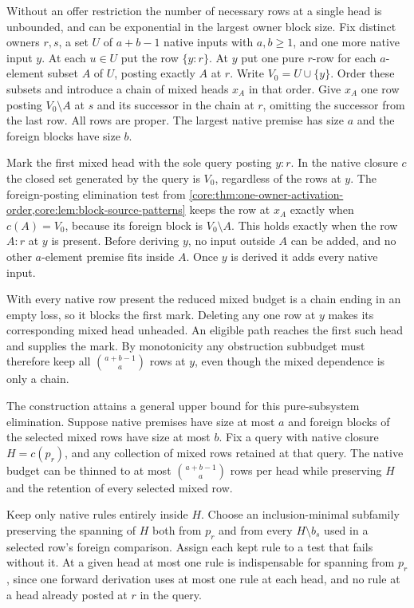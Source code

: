 Without an offer restriction the number of necessary
rows at a single head is unbounded, and can be
exponential in the largest owner block size. Fix
distinct owners $r,s$, a set $U$ of $a+b-1$ native
inputs with $a,b\ge1$, and one more native input $y$.
At each
$u\in U$ put the row $\{y:r\}$. At $y$ put one
pure $r$-row for each $a$-element subset $A$ of $U$,
posting exactly $A$ at $r$. Write $V_0=U\cup\{y\}$.
Order these subsets and introduce a chain of mixed
heads $x_A$ in that order. Give $x_A$ one row
posting $V_0\setminus A$ at $s$ and its successor
in the chain at $r$, omitting the successor from
the last row. All rows are proper. The largest
native premise has size $a$ and the foreign blocks
have size $b$.

Mark the first mixed head with the sole query
posting $y:r$. In the native closure $c$ the
closed set generated by the query is $V_0$,
regardless of the rows at $y$. The foreign-posting
elimination test from
\cref{core:thm:one-owner-activation-order,core:lem:block-source-patterns}
keeps the row at $x_A$ exactly
when $c(A)=V_0$, because its foreign block is
$V_0\setminus A$. This holds exactly when the
row $A:r$ at $y$ is present. Before deriving $y$,
no input outside $A$ can be added, and no other
$a$-element premise fits inside $A$. Once $y$
is derived it adds every native input.

With every native row present the reduced mixed
budget is a chain ending in an empty loss, so it
blocks the first mark. Deleting any one row at
$y$ makes its corresponding mixed head unheaded.
An eligible path reaches the first such head
and supplies the mark. By monotonicity any
obstruction subbudget must therefore keep all
$\binom{a+b-1}{a}$ rows at $y$, even though the
mixed dependence is only a chain.

The construction attains a general upper bound for
this pure-subsystem elimination. Suppose native premises
have size at most $a$ and foreign blocks of the selected
mixed rows have size at most $b$. Fix a query with native closure
$H=c(p_r)$, and any collection of mixed rows retained
at that query. The native budget can be thinned to at
most $\binom{a+b-1}{a}$ rows per head while preserving
$H$ and the retention of every selected mixed row.

Keep only native rules entirely inside $H$. Choose
an inclusion-minimal subfamily preserving the spanning
of $H$ both from $p_r$ and from every $H\setminus b_s$
used in a selected row's foreign comparison. Assign
each kept rule to a test that fails without it. At a
given head at most one rule is indispensable for
spanning from $p_r$, since one forward derivation
uses at most one rule at each head, and no rule at a
head already posted at $r$ in the query.

